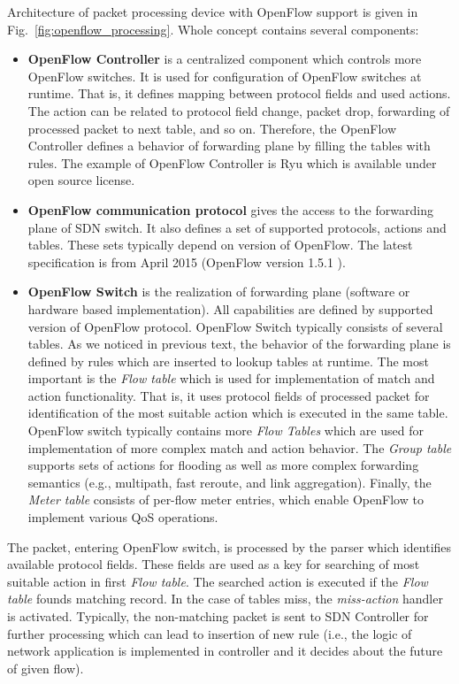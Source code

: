 Architecture of packet processing device with OpenFlow support is given in Fig.~\ref{fig:openflow_processing}. 
Whole concept contains several components:
\begin{itemize}
   \item \textbf{OpenFlow Controller} is a centralized component which controls more OpenFlow switches.
   It is used for configuration of OpenFlow switches at runtime. That is, it defines mapping between protocol fields
   and used actions. The action can be related to protocol field change, packet drop, forwarding of processed packet to next table, and so on. 
   Therefore, the OpenFlow Controller defines a behavior of forwarding plane by filling the tables with rules.
   The example of OpenFlow Controller is Ryu \cite{RyuController} which is available under open source license.
   \item \textbf{OpenFlow communication protocol} gives the access to the forwarding plane of SDN switch. It also defines a set of supported
   protocols, actions and tables. These sets typically depend on version of OpenFlow.  
   The latest specification is from April 2015 (OpenFlow version 1.5.1 \cite{OpenFlowSpec}).
   \item \textbf{OpenFlow Switch} is the realization of forwarding plane (software or hardware based implementation). 
   All capabilities are defined by supported version of OpenFlow protocol. OpenFlow Switch typically consists of several tables.
   As we noticed in previous text, the behavior of the forwarding plane is defined by rules which are inserted to lookup tables at runtime.
   The most important is the \textit{Flow table} which is used for implementation of match and action functionality. 
   That is, it uses protocol fields of processed packet for identification of the most suitable action which is executed in the same table. 
   OpenFlow switch typically contains more \textit{Flow Tables} which are used for implementation of more complex match and action behavior.
   The \textit{Group table} supports sets of actions for flooding as well as more complex forwarding semantics 
   (e.g., multipath, fast reroute, and link aggregation).
   Finally, the \textit{Meter table} consists of per-flow meter entries, which enable OpenFlow to implement various QoS operations.
\end{itemize}

The packet, entering OpenFlow switch, is processed by the parser which identifies available protocol fields. These fields are used as a key for 
searching of most suitable action in first \textit{Flow table}. 
The searched action is executed if the \textit{Flow table} founds matching record. 
In the case of tables miss, the \textit{miss-action} handler is activated. Typically, the non-matching packet is sent to
SDN Controller for further processing which can lead to insertion of new rule (i.e., the logic of network application is implemented
in controller and it decides about the future of given flow).

